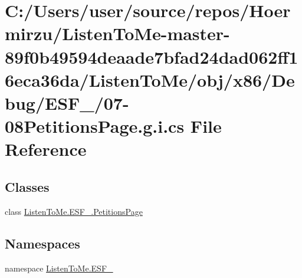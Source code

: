 \hypertarget{07-08_petitions_page_8g_8i_8cs}{}\section{C\+:/\+Users/user/source/repos/\+Hoermirzu/\+Listen\+To\+Me-\/master-\/89f0b49594deaade7bfad24dad062ff16eca36da/\+Listen\+To\+Me/obj/x86/\+Debug/\+E\+S\+F\+\_/07-\/08\+Petitions\+Page.g.\+i.\+cs File Reference}
\label{07-08_petitions_page_8g_8i_8cs}
\subsection*{Classes}
\begin{DoxyCompactItemize}
\item 
class \hyperlink{class_listen_to_me_1_1_e_s_f__2_1_1_petitions_page}{Listen\+To\+Me.\+E\+S\+F\+\_.\+Petitions\+Page}
\end{DoxyCompactItemize}
\subsection*{Namespaces}
\begin{DoxyCompactItemize}
\item 
namespace \hyperlink{namespace_listen_to_me_1_1_e_s_f__2}{Listen\+To\+Me.\+E\+S\+F\+\_}
\end{DoxyCompactItemize}
